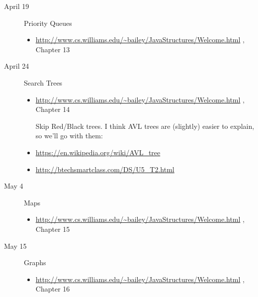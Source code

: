 \documentclass{article}
\newcommand{\bailey}{
  \url{http://www.cs.williams.edu/~bailey/JavaStructures/Welcome.html}
  }
\begin{document}
\begin{description}
\item[April 19] Priority Queues
  \begin{itemize}
  \item \bailey, Chapter 13
  \end{itemize}

\item[April 24] Search Trees
  \begin{itemize}
  \item \bailey, Chapter 14

    Skip Red/Black trees.
      I think
  AVL trees are (slightly) easier to explain, so we'll go with them:

\item \url{https://en.wikipedia.org/wiki/AVL_tree}
\item\url{http://btechsmartclass.com/DS/U5_T2.html}
  
  \end{itemize}

\item[May 4] Maps
  \begin{itemize}
  \item \bailey, Chapter 15
  \end{itemize}

\item[May 15] Graphs
  \begin{itemize}
  \item \bailey, Chapter 16
  \end{itemize}
  

\end{description}
\end{document}
